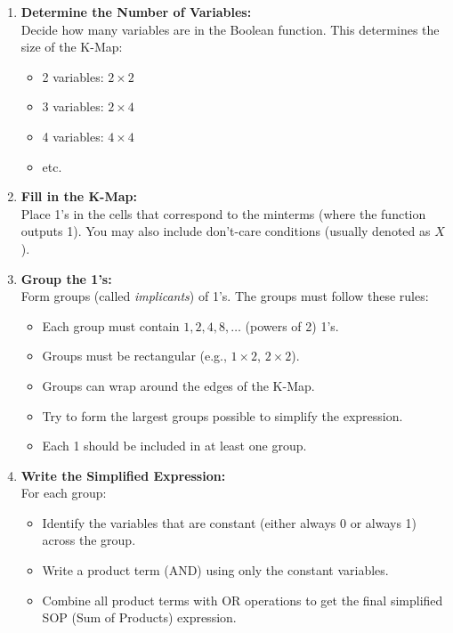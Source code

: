 \begin{enumerate}
    \item \textbf{Determine the Number of Variables:} \\
    Decide how many variables are in the Boolean function. This determines the size of the K-Map:
    \begin{itemize}
        \item 2 variables: $2 \times 2$
        \item 3 variables: $2 \times 4$
        \item 4 variables: $4 \times 4$
        \item etc.
    \end{itemize}

    \item \textbf{Fill in the K-Map:} \\
    Place 1's in the cells that correspond to the minterms (where the function outputs 1). You may also include don't-care conditions (usually denoted as $X$).

    \item \textbf{Group the 1's:} \\
    Form groups (called \emph{implicants}) of 1's. The groups must follow these rules:
    \begin{itemize}
        \item Each group must contain $1, 2, 4, 8, \ldots$ (powers of 2) 1's.
        \item Groups must be rectangular (e.g., $1 \times 2$, $2 \times 2$).
        \item Groups can wrap around the edges of the K-Map.
        \item Try to form the largest groups possible to simplify the expression.
        \item Each 1 should be included in at least one group.
    \end{itemize}

    \item \textbf{Write the Simplified Expression:} \\
    For each group:
    \begin{itemize}
        \item Identify the variables that are constant (either always 0 or always 1) across the group.
        \item Write a product term (AND) using only the constant variables.
        \item Combine all product terms with OR operations to get the final simplified SOP (Sum of Products) expression.
    \end{itemize}
\end{enumerate}


